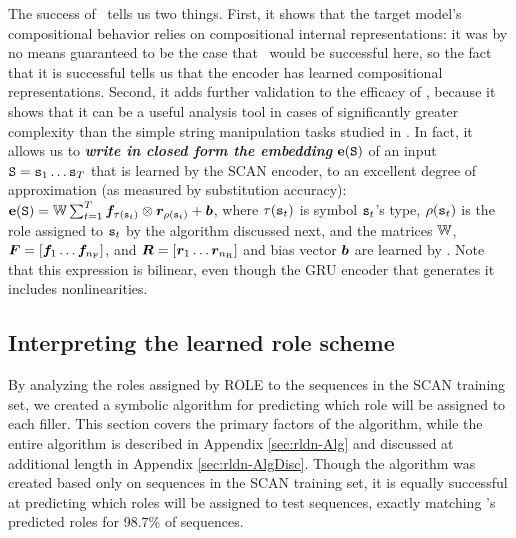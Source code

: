 The success of \RLN\ 
tells us two things. First, it shows that the target model's compositional behavior relies on compositional internal representations: it was by no means guaranteed to be the case that \RLN\ would be successful here, so the fact that it is successful tells us that the encoder has learned compositional representations. Second, it adds further validation to the efficacy of \RLN, because it shows that it can be a useful analysis tool in cases of significantly greater complexity than the simple string manipulation tasks studied in \citet{mccoy}. 
In fact, it allows us to \textit{\textbf{write in closed form the embedding}} ${\mathbf{e}}({\mathtt{S}})$ of an input ${\mathtt{S}} = {\mathtt{s}}_1\ldots{\mathtt{s}}_T$ that is learned by the SCAN encoder, to an excellent degree of approximation (as measured by substitution accuracy):
${\mathbf{e}}({\mathtt{S}}) = {\mathbb{W}} \sum_{t=1}^T {\bm{f}}_{\tau({\mathtt{s}}_t)} \otimes {\bm{r}}_{\rho({\mathtt{s}}_t)} + {\bm{b}}$, where $\tau({\mathtt{s}}_t)$ is symbol ${\mathtt{s}}_t$'s type, $\rho({\mathtt{s}}_t)$ is the role assigned to ${\mathtt{s}}_t$ by the algorithm discussed next,
and the matrices ${\mathbb{W}}$, ${\bm{F}} = [{\bm{f}}_1 \ldots {\bm{f}}_{n_{\mathrm{F}}} ]$, and ${\bm{R}} = [{\bm{r}}_1 \ldots {\bm{r}}_{n_{\mathrm{R}}}]$ and bias vector ${\bm{b}}$ are learned by \RLN.
Note that this expression is bilinear, even though the GRU encoder that generates it includes nonlinearities.

\subsection{Interpreting the learned role scheme}\label{sec:rldn-scan-role-interpretation}

By analyzing the roles assigned by ROLE to the sequences in the SCAN training set, we created a symbolic algorithm for predicting which role will be assigned to each filler. This section covers the primary factors of the algorithm, while the entire algorithm is described in Appendix \ref{sec:rldn-Alg} and discussed at additional length in Appendix \ref{sec:rldn-AlgDisc}. Though the algorithm was created based only on sequences in the SCAN training set, it is equally successful at predicting which roles will be assigned to test sequences, exactly matching \RLN's predicted roles for 98.7\% of sequences.

